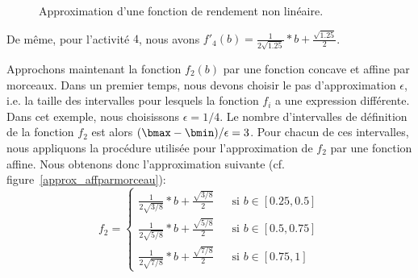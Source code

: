 \begin{ex}
\begin{figure}[!htb]
{}
    \caption{Approximation d'une fonction de rendement non linéaire.}
    \label{approx}
  \end{figure}

  De même, pour l'activité $4$, nous avons
  $f'_4(b)=\frac{1}{2\sqrt{1.25}}*b+ \frac{\sqrt{1.25}}{2}$.

  Approchons maintenant la fonction $f_2(b)$  par une
  fonction concave et affine par morceaux. Dans un premier temps,
  nous devons choisir le pas d'approximation $\epsilon$, i.e. la taille
  des intervalles pour lesquels la fonction $f_i$ a une
  expression différente. Dans cet exemple, nous choisissons
  $\epsilon=1/4$. Le nombre d'intervalles de définition de la fonction
  $f_2$ est alors $(\bmax-\bmin)/\epsilon=3$. Pour chacun de ces
  intervalles, nous appliquons la procédure utilisée pour
  l'approximation de $f_2$ par une fonction affine. Nous obtenons donc
  l'approximation suivante (cf. figure~\ref{approx_affparmorceau}):
  \[f_2=\left\{ 
      \begin{array}{lll}
        \frac{1}{2\sqrt{3/8}}*b + \frac{\sqrt{3/8}}{2}& & \text{si } b \in
                                                          [0.25,0.5]\\
        \frac{1}{2\sqrt{5/8}}*b + \frac{\sqrt{5/8}}{2}& & \text{si } b \in [0.5,0.75]\\
        \frac{1}{2\sqrt{7/8}}*b + \frac{\sqrt{7/8}}{2}& & \text{si } b \in [0.75,1]
      \end{array}
    \right.\]
  
\end{ex}

